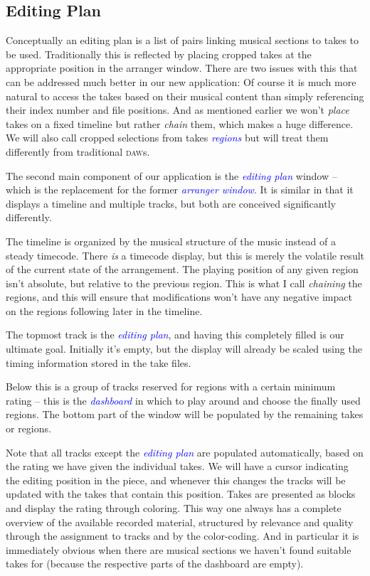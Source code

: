 \documentclass[11pt,a4paper]{article}
\newcommand*{\term}[1]{\textcolor{blue}{\emph{#1}}}
\begin{document}
\subsection{Editing Plan}
Conceptually an editing plan is a list of pairs linking musical sections to
takes to be used.
Traditionally this is reflected by placing cropped takes at the appropriate
position in the arranger window.
There are two issues with this that can be addressed much better in our new
application:
Of course it is much more natural to access the takes based on their musical
content than simply referencing their index number and file positions.
And as mentioned earlier we won't \emph{place} takes on a fixed timeline but
rather \emph{chain} them, which makes a huge difference.
We will also call cropped selections from takes \term{regions} but will treat them
differently from traditional \textsc{daw}s.

\medskip
The second main component of our application is the \term{editing plan} window
-- which is the replacement for the former \term{arranger window}.
It is similar in that it displays a timeline and multiple tracks, but both are
conceived significantly differently.

The timeline is organized by the musical structure of the music instead of a
steady timecode.
There \emph{is} a timecode display, but this is merely the volatile result of
the current state of the arrangement.
The playing position of any given region isn't absolute, but relative to the
previous region.
This is what I call \emph{chaining} the regions, and this will ensure that
modifications won't have any negative impact on the regions following later in
the timeline.

The topmost track is the \term{editing plan}, and having this completely filled
is our ultimate goal.
Initially it's empty, but the display will already be scaled using the timing
information stored in the take files.

Below this is a group of tracks reserved for regions with a certain minimum
rating -- this is the \term{dashboard} in which to play around and choose the finally
used regions.
The bottom part of the window will be populated by the remaining takes or
regions.

Note that all tracks except the \term{editing plan} are populated automatically, based
on the rating we have given the individual takes.
We will have a cursor indicating the editing position in the piece, and
whenever this changes the tracks will be updated with the takes that contain
this position.
Takes are presented as blocks and display the rating through coloring.
This way one always has a complete overview of the available recorded material,
structured by relevance and quality through the assignment to tracks and by the
color-coding.
And in particular it is immediately obvious when there are musical sections we
haven't found suitable takes for (because the respective parts of the
dashboard are empty).
\end{document}
